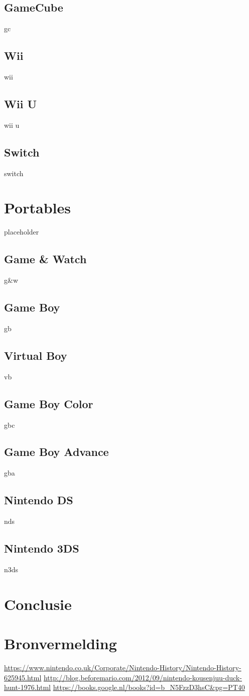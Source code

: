 \documentclass{article}
\begin{document}
\subsection{GameCube}
gc
\subsection{Wii}
wii
\subsection{Wii U}
wii u
\subsection{Switch}
switch

\section{Portables}
placeholder
\subsection{Game \& Watch}
g\&w
\subsection{Game Boy}
gb
\subsection{Virtual Boy}
vb
\subsection{Game Boy Color}
gbc
\subsection{Game Boy Advance}
gba
\subsection{Nintendo DS}
nds
\subsection{Nintendo 3DS}
n3ds
\section{Conclusie}
\section{Bronvermelding}
\url{https://www.nintendo.co.uk/Corporate/Nintendo-History/Nintendo-History-625945.html}
\url{http://blog.beforemario.com/2012/09/nintendo-kousenjuu-duck-hunt-1976.html}
\url{https://books.google.nl/books?id=b_N5FzzD3hsC&pg=PT40}
\end{document}
